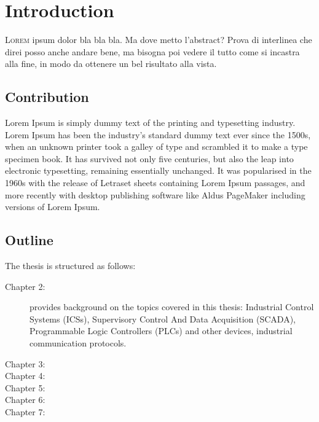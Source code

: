 \chapter{Introduction}
\label{intro}

\lettrine[lines=2]{L}{orem} ipsum dolor bla bla bla. Ma dove metto l'abstract? Prova di interlinea che direi posso anche andare bene, ma bisogna poi vedere il tutto come si incastra alla fine, in modo da ottenere un bel risultato alla vista. 

\section{Contribution}
\label{sec:contribution}

Lorem Ipsum is simply dummy text of the printing and typesetting industry. Lorem Ipsum has been the industry's standard dummy text ever since the 1500s, when an unknown printer took a galley of type and scrambled it to make a type specimen book. It has survived not only five centuries, but also the leap into electronic typesetting, remaining essentially unchanged. It was popularised in the 1960s with the release of Letraset sheets containing Lorem Ipsum passages, and more recently with desktop publishing software like Aldus PageMaker including versions of Lorem Ipsum.

\section{Outline}
\label{sec:outline}
The thesis is structured as follows:

\begin{description}
	\item [Chapter 2:] provides background on the topics covered in this thesis: Industrial Control Systems (ICSs), Supervisory Control And Data Acquisition (SCADA), Programmable Logic Controllers (PLCs) and other devices, industrial communication protocols.
	\item [Chapter 3:]
	\item [Chapter 4:]
	\item [Chapter 5:]
	\item [Chapter 6:]
	\item [Chapter 7:]
\end{description}
